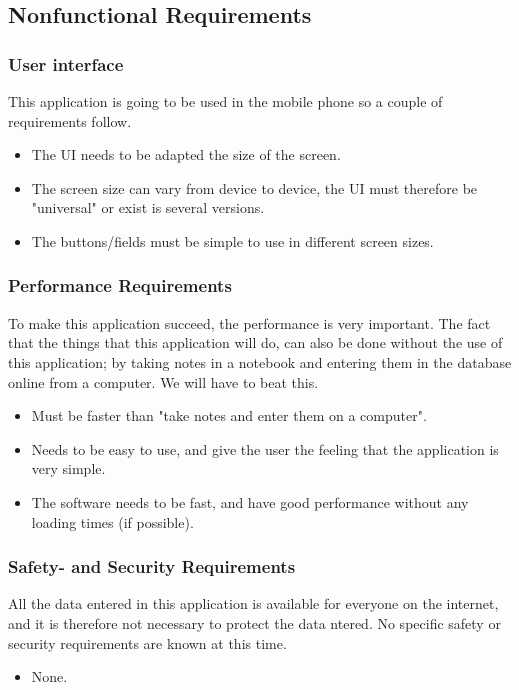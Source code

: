 \subsection{Nonfunctional Requirements}

\subsubsection{User interface}
	This application is going to be used in the mobile phone so a couple of requirements follow.
	\begin{itemize}
		\item The UI needs to be adapted the size of the screen.
		\item The screen size can vary from device to device, the UI must therefore be "universal" or exist is several versions. 
		\item The buttons/fields must be simple to use in different screen sizes.
	\end{itemize}
\subsubsection{Performance Requirements}
	To make this application succeed, the performance is very important. The fact that the things that this application will do, can also be done without the use of this application; by taking notes in a notebook and entering them in the database online from a computer. We will have to beat this.
	\begin{itemize}
		\item Must be faster than "take notes and enter them on a computer".
		\item Needs to be easy to use, and give the user the feeling that the application is very simple.
		\item The software needs to be fast, and have good performance without any loading times (if possible).
	\end{itemize}

\subsubsection{ Safety- and Security Requirements}
	All the data entered in this application  is available for everyone on the internet, and it is therefore not necessary to protect the data ntered. No specific safety or security requirements are known at this time.
	\begin{itemize}
		\item None.
	\end{itemize}
